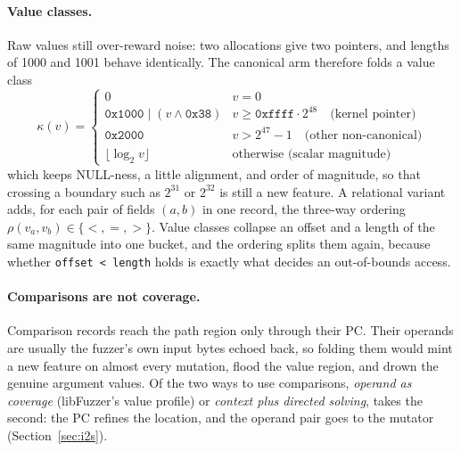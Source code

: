 \documentclass{article}
\begin{document}
\paragraph{Value classes.} Raw values still over-reward noise: two allocations
give two pointers, and lengths of 1000 and 1001 behave identically. The
canonical arm therefore folds a value class
\[ \kappa(v) = \begin{cases}
0 & v = 0\\
\texttt{0x1000} \;|\; (v \wedge \texttt{0x38}) & v \geq \texttt{0xffff}\cdot 2^{48} \quad\text{(kernel pointer)}\\
\texttt{0x2000} & v > 2^{47}-1 \quad\text{(other non-canonical)}\\
\lfloor \log_2 v \rfloor & \text{otherwise (scalar magnitude)}
\end{cases} \]
which keeps NULL-ness, a little alignment, and order of magnitude, so that
crossing a boundary such as $2^{31}$ or $2^{32}$ is still a new feature. A
relational variant adds, for each pair of fields $(a, b)$ in one record, the
three-way ordering $\rho(v_a, v_b) \in \{<, =, >\}$. Value classes collapse
an offset and a length of the same magnitude into one bucket, and the ordering
splits them again, because whether \texttt{offset < length} holds is exactly
what decides an out-of-bounds access.

\paragraph{Comparisons are not coverage.} Comparison records reach the path
region only through their PC. Their operands are usually the fuzzer's own
input bytes echoed back, so folding them would mint a new feature on almost
every mutation, flood the value region, and drown the genuine argument
values. Of the two ways to use comparisons, \emph{operand as coverage}
(libFuzzer's value profile) or \emph{context plus directed solving},
\toolname takes the second: the PC refines the location, and the operand
pair goes to the mutator (Section~\ref{sec:i2s}).
\end{document}
